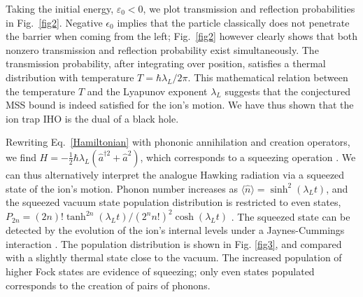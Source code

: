 \documentclass[prl,twocolumn,superscriptaddress,floatfix,showpacs,amsmath,longbibliography,nofootinbib,amssymb]{revtex4-1}
\newcommand{\colp}[1]{\textcolor{purple}{#1}}
\begin{document}
Taking the initial energy, $\varepsilon_0<0$, 
we plot transmission and reflection probabilities in Fig.~\ref{fig2}. 
Negative $\epsilon_0$ implies that the particle
classically does not penetrate the barrier when coming from the left; 
Fig.~\ref{fig2} however clearly shows that both nonzero transmission and reflection probability 
exist simultaneously. 
The transmission probability, after integrating over position, 
satisfies a thermal distribution with temperature $T=\hbar\lambda_L/2\pi$. 
This mathematical relation between the temperature $T$ and the Lyapunov exponent $\lambda_L$ suggests that the conjectured MSS bound \cite{bound} is indeed satisfied for the ion's motion. 
We have thus shown that the ion trap IHO is the dual of a black hole. 


Rewriting Eq.~\eqref{Hamiltonian} with phononic annihilation and creation operators, 
we find $H=-\frac{1}{2}\hbar\lambda_L(\hat{a}^{\dagger2}+\hat{a}^2)$, which  
corresponds to a squeezing operation \cite{Loock}. %
We can thus alternatively interpret the analogue Hawking radiation via a squeezed state of the ion's motion. 
Phonon number increases as  
$\langle\hat{n}\rangle=\sinh^2(\lambda_Lt)$, and the squeezed vacuum state population distribution 
is restricted to even states, $P_{2n}=(2n)!\tanh^{2n}(\lambda_Lt)/(2^nn!)^2\cosh(\lambda_Lt)$  \cite{WANG20071}. 
The squeezed state can be detected by the evolution of the ion's internal levels under a Jaynes-Cummings interaction \cite{PhysRevLett.76.1796}. %
The population distribution is shown in Fig. \ref{fig3}, and 
compared with a slightly thermal state close to the vacuum.  
The increased population of higher Fock states   
are evidence of squeezing; only even states populated corresponds to the creation of pairs of phonons. 
\end{document}
